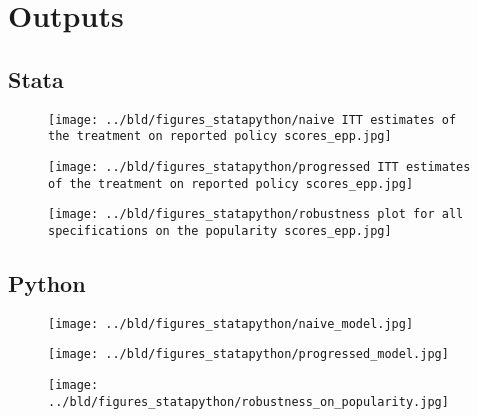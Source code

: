 \documentclass[10pt]{article}
\begin{document}
\section{Outputs}
\subsection{Stata}

\begin{figure}
    \begin{center}
        \texttt{[image: ../bld/figures\_statapython/naive ITT estimates of the treatment on reported policy scores\_epp.jpg]}
    \end{center}
    \caption{}
\end{figure}

\begin{figure}
    \begin{center}
        \texttt{[image: ../bld/figures\_statapython/progressed ITT estimates of the treatment on reported policy scores\_epp.jpg]}
    \end{center}
    \caption{}
\end{figure}

\begin{figure}
    \begin{center}
        \texttt{[image: ../bld/figures\_statapython/robustness plot for all specifications on the popularity scores\_epp.jpg]}
    \end{center}
    \caption{}
\end{figure}

\subsection{Python}

\begin{figure}
    \begin{center}
        \texttt{[image: ../bld/figures\_statapython/naive\_model.jpg]}
    \end{center}
    \caption{}
\end{figure}


\begin{figure}
    \begin{center}
        \texttt{[image: ../bld/figures\_statapython/progressed\_model.jpg]}
    \end{center}
    \caption{}
\end{figure}

\begin{figure}
    \begin{center}
        \texttt{[image: ../bld/figures\_statapython/robustness\_on\_popularity.jpg]}
    \end{center}
    \caption{}
\end{figure}
\end{document}
